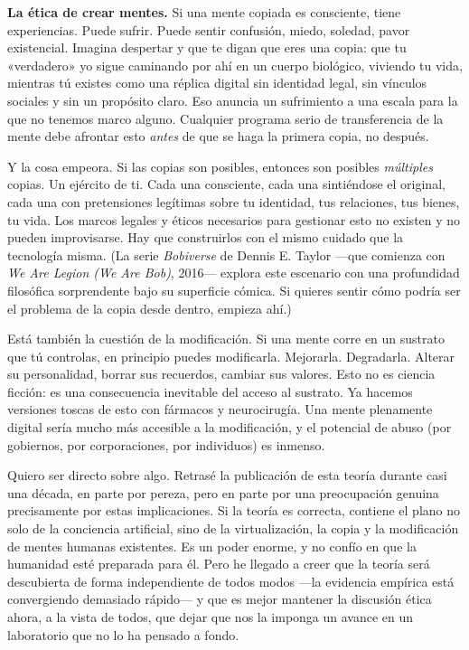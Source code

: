 \documentclass[11pt, twoside, openright]{book}
\begin{document}
\textbf{La ética de crear mentes.} Si una mente copiada es consciente, tiene experiencias. Puede sufrir. Puede sentir confusión, miedo, soledad, pavor existencial. Imagina despertar y que te digan que eres una copia: que tu «verdadero» yo sigue caminando por ahí en un cuerpo biológico, viviendo tu vida, mientras tú existes como una réplica digital sin identidad legal, sin vínculos sociales y sin un propósito claro. Eso anuncia un sufrimiento a una escala para la que no tenemos marco alguno. Cualquier programa serio de transferencia de la mente debe afrontar esto \textit{antes} de que se haga la primera copia, no después.

Y la cosa empeora. Si las copias son posibles, entonces son posibles \textit{múltiples} copias. Un ejército de ti. Cada una consciente, cada una sintiéndose el original, cada una con pretensiones legítimas sobre tu identidad, tus relaciones, tus bienes, tu vida. Los marcos legales y éticos necesarios para gestionar esto no existen y no pueden improvisarse. Hay que construirlos con el mismo cuidado que la tecnología misma. (La serie \textit{Bobiverse} de Dennis E. Taylor ---que comienza con \textit{We Are Legion (We Are Bob)}, 2016--- explora este escenario con una profundidad filosófica sorprendente bajo su superficie cómica. Si quieres sentir cómo podría ser el problema de la copia desde dentro, empieza ahí.)

Está también la cuestión de la modificación. Si una mente corre en un sustrato que tú controlas, en principio puedes modificarla. Mejorarla. Degradarla. Alterar su personalidad, borrar sus recuerdos, cambiar sus valores. Esto no es ciencia ficción: es una consecuencia inevitable del acceso al sustrato. Ya hacemos versiones toscas de esto con fármacos y neurocirugía. Una mente plenamente digital sería mucho más accesible a la modificación, y el potencial de abuso (por gobiernos, por corporaciones, por individuos) es inmenso.

Quiero ser directo sobre algo. Retrasé la publicación de esta teoría durante casi una década, en parte por pereza, pero en parte por una preocupación genuina precisamente por estas implicaciones. Si la teoría es correcta, contiene el plano no solo de la conciencia artificial, sino de la virtualización, la copia y la modificación de mentes humanas existentes. Es un poder enorme, y no confío en que la humanidad esté preparada para él. Pero he llegado a creer que la teoría será descubierta de forma independiente de todos modos ---la evidencia empírica está convergiendo demasiado rápido--- y que es mejor mantener la discusión ética ahora, a la vista de todos, que dejar que nos la imponga un avance en un laboratorio que no lo ha pensado a fondo.
\end{document}
